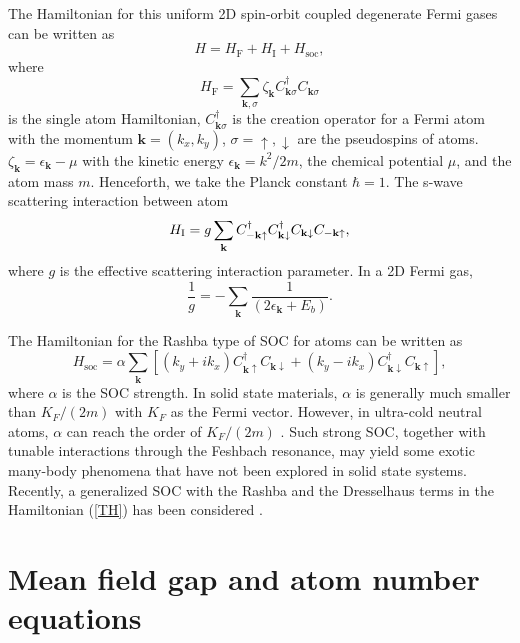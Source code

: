 \documentclass[pra,print,showpacs,superscriptaddress,twocolumn]{revtex4}
\begin{document}
The Hamiltonian for this uniform 2D spin-orbit coupled degenerate Fermi
gases can be written as%
\begin{equation}
H=H_{\text{F}}+H_{\text{I}}+H_{\text{soc}},  \label{TH}
\end{equation}%
where
\begin{equation}
H_{\text{F}}=\sum_{\mathbf{k},\sigma }\zeta _{\mathbf{k}}C_{\mathbf{k}\sigma
}^{\dagger }C_{\mathbf{k}\sigma }  \label{HF}
\end{equation}%
is the single atom Hamiltonian, $C_{\mathbf{k}\sigma }^{\dagger }$ is the
creation operator for a Fermi atom with the momentum $\mathbf{k}=\left(
k_{x},k_{y}\right) $, $\sigma =\uparrow ,\downarrow $ are the pseudospins of
atoms. $\zeta _{\mathbf{k}}=\epsilon _{\mathbf{k}}-\mu $ with the kinetic
energy $\epsilon _{\mathbf{k}}=k^{2}/2m$, the chemical potential $\mu $, and
the atom mass $m$. Henceforth, we take the Planck constant $\hbar =1$. The
s-wave scattering interaction between atom
\begin{equation}
H_{\text{I}}=g\sum_{\mathbf{k}}C_{-\mathbf{k}\uparrow }^{\dagger }C_{\mathbf{%
k}\downarrow }^{\dagger }C_{\mathbf{k}\downarrow }C_{-\mathbf{k}\uparrow },
\label{HI}
\end{equation}%
where $g$ is the effective scattering interaction parameter. In a 2D Fermi
gas,
\begin{equation}
\frac{1}{g}=-\sum_{\mathbf{k}}\frac{1}{(2\epsilon _{\mathbf{k}}+E_{b})}.
\label{PG}
\end{equation}

The Hamiltonian for the Rashba type of SOC for atoms can be written as
\begin{equation}
H_{\text{soc}}=\alpha \sum_{\mathbf{k}}[(k_{y}+ik_{x})C_{\mathbf{k}\uparrow
}^{\dagger }C_{\mathbf{k}\downarrow }+(k_{y}-ik_{x})C_{\mathbf{k}\downarrow
}^{\dagger }C_{\mathbf{k}\uparrow }],  \label{HSOC}
\end{equation}%
where $\alpha $ is the SOC strength. In solid state materials, $\alpha $ is
generally much smaller than $K_{F}/(2m)$ with $K_{F}$ as the Fermi vector.
However, in ultra-cold neutral atoms, $\alpha $ can reach the order of $%
K_{F}/(2m)$ \cite{lasersetup}. Such strong SOC, together with tunable
interactions through the Feshbach resonance, may yield some exotic many-body
phenomena that have not been explored in solid state systems. Recently, a
generalized SOC with the Rashba and the Dresselhaus terms in the Hamiltonian
(\ref{TH}) has been considered \cite{LD}.

\section{Mean field gap and atom number equations}
\end{document}
